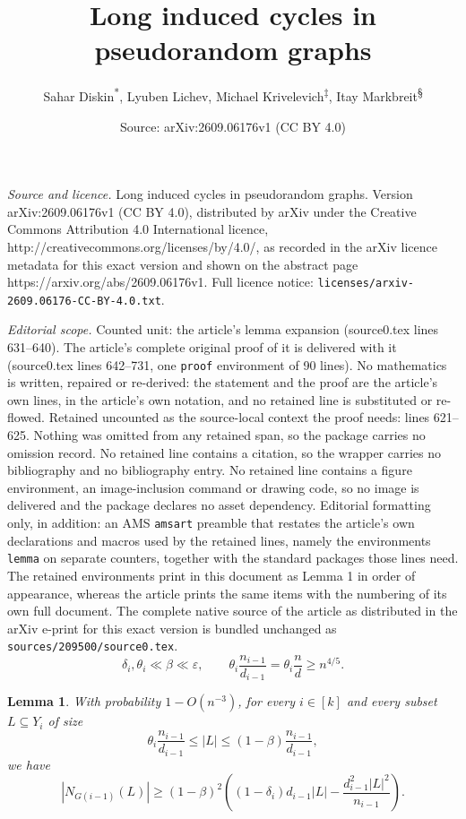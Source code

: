 \documentclass[10pt,a4paper]{amsart}
\title{Long induced cycles in pseudorandom graphs}
\author{Sahar Diskin\textsuperscript{*}, Lyuben Lichev\textsuperscript{\textdagger}, Michael Krivelevich\textsuperscript{$\ddagger$}, Itay Markbreit\textsuperscript{\S}}
\date{Source: arXiv:2609.06176v1 (CC BY 4.0)}
\newtheorem{lemma}{Lemma}
\newcommand{\eps}{\varepsilon}
\begin{document}
\maketitle

\noindent\emph{Source and licence.} Long induced cycles in pseudorandom graphs. Version arXiv:2609.06176v1 (CC BY 4.0), distributed by arXiv under the Creative Commons Attribution 4.0 International licence, http://creativecommons.org/licenses/by/4.0/, as recorded in the arXiv licence metadata for this exact version and shown on the abstract page https://arxiv.org/abs/2609.06176v1. Full licence notice: \texttt{licenses/arxiv-2609.06176-CC-BY-4.0.txt}.\par\smallskip

\noindent\textit{Editorial scope.} Counted unit: the article's lemma expansion (source0.tex lines 631--640). The article's complete original proof of it is delivered with it (source0.tex lines 642--731, one \texttt{proof} environment of 90 lines). No mathematics is written, repaired or re-derived: the statement and the proof are the article's own lines, in the article's own notation, and no retained line is substituted or re-flowed.  Retained uncounted as the source-local context the proof needs: lines 621--625.  Nothing was omitted from any retained span, so the package carries no omission record.  No retained line contains a citation, so the wrapper carries no bibliography and no bibliography entry.  No retained line contains a figure environment, an image-inclusion command or drawing code, so no image is delivered and the package declares no asset dependency.  Editorial formatting only, in addition: an AMS \texttt{amsart} preamble that restates the article's own declarations and macros used by the retained lines, namely the environments \texttt{lemma} on separate counters, together with the standard packages those lines need.  The retained environments print in this document as Lemma 1 in order of appearance, whereas the article prints the same items with the numbering of its own full document.  The complete native source of the article as distributed in the arXiv e-print for this exact version is bundled unchanged as \texttt{sources/209500/source0.tex}.
\begin{equation}\label{eq: theta-bounds}
    \delta_i,\theta_i\ll\beta\ll\eps,
    \qquad
    \theta_i\frac{n_{i-1}}{d_{i-1}} = \theta_i\frac{n}{d}\ge n^{4/5}.
\end{equation}

\begin{lemma}\label{l: expansion}
With probability $1-O(n^{-3})$, for every $i\in[k]$ and every subset $L\subseteq Y_i$ of size
\[
    \theta_i\frac{n_{i-1}}{d_{i-1}}\le |L|\le (1-\beta)\frac{n_{i-1}}{d_{i-1}},
\]
we have
\[
    |N_{G(i-1)}(L)|\ge (1-\beta)^2\left((1-\delta_i)d_{i-1}|L|-\frac{d_{i-1}^2|L|^2}{n_{i-1}}\right).
\]
\end{lemma}
\end{document}
